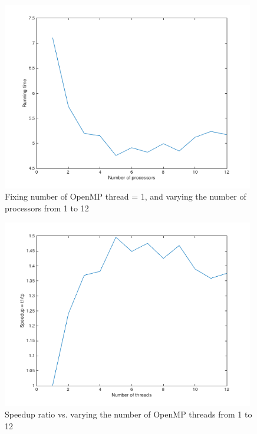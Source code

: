 \documentclass[11pt]{article}
\begin{document}
\begin{figure}[H]
	\begin{center}
		\includegraphics[width=11cm]{strongplot}
		\caption{Fixing number of OpenMP thread = 1, and varying the number of processors from 1 to 12}
		\label{fig:strongplot}
	\end{center}
\end{figure}

\begin{figure}[H]
	\begin{center}
		\includegraphics[width=11cm]{speedupstrong}
		\caption{Speedup ratio vs. varying the number of OpenMP threads from 1 to 12 }
		\label{fig:speedupstrong}
	\end{center}
\end{figure}
\end{document}
